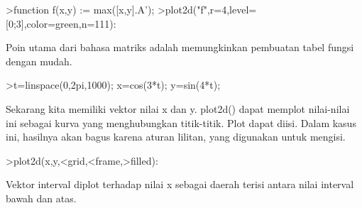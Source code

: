 \documentclass[a4paper,10pt]{article}
\begin{document}
\begin{eulernotebook}
\begin{eulercomment}
\begin{eulercomment}
\begin{eulercomment}
\begin{eulercomment}
\begin{eulercomment}
\begin{eulercomment}
\begin{eulercomment}
\begin{eulercomment}
\begin{eulercomment}
\begin{eulercomment}
\begin{eulerprompt}
>function f(x,y) := max([x,y].A');
>plot2d("f",r=4,level=[0;3],color=green,n=111):
\end{eulerprompt}
\begin{eulercomment}
Poin utama dari bahasa matriks adalah memungkinkan pembuatan tabel
fungsi dengan mudah.
\end{eulercomment}
\begin{eulerprompt}
>t=linspace(0,2pi,1000); x=cos(3*t); y=sin(4*t);
\end{eulerprompt}
\begin{eulercomment}
Sekarang kita memiliki vektor nilai x dan y. plot2d() dapat memplot
nilai-nilai ini sebagai kurva yang menghubungkan titik-titik. Plot
dapat diisi. Dalam kasus ini, hasilnya akan bagus karena aturan
lilitan, yang digunakan untuk mengisi.
\end{eulercomment}
\begin{eulerprompt}
>plot2d(x,y,<grid,<frame,>filled):
\end{eulerprompt}
\begin{eulercomment}
Vektor interval diplot terhadap nilai x sebagai daerah terisi antara
nilai interval bawah dan atas.


\end{eulercomment}
\end{eulercomment}
\end{eulercomment}
\end{eulercomment}
\end{eulercomment}
\end{eulercomment}
\end{eulercomment}
\end{eulercomment}
\end{eulercomment}
\end{eulercomment}
\end{eulercomment}
\end{eulernotebook}
\end{document}
